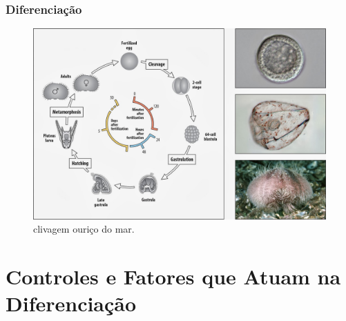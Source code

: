 \documentclass[brazil]{beamer}
\begin{document}
  \begin{frame}  
  \frametitle{Diferenciação}
    \raggedright 
    
    \begin{figure}
      \includegraphics[scale=0.15]{clivagem_ourico_do_mar.jpg}
      \caption{\tiny clivagem ouriço do mar.}
     \end{figure}
  \end{frame}

\section{Controles e Fatores que Atuam na Diferenciação}
\end{document}

